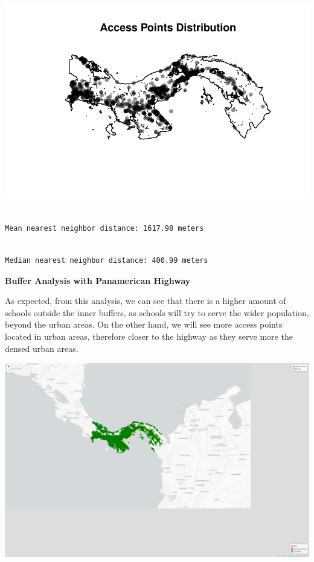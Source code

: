 \documentclass[
  letterpaper,
  DIV=11,
  numbers=noendperiod]{scrartcl}
\begin{document}
\includegraphics{index_files/figure-pdf/pairwise-intensity-2.pdf}

\begin{verbatim}

Mean nearest neighbor distance: 1617.98 meters
\end{verbatim}

\begin{verbatim}

Median nearest neighbor distance: 400.99 meters
\end{verbatim}

\textbf{Buffer Analysis with Panamerican Highway}

As expected, from this analysis, we can see that there is a higher
amount of schools outside the inner buffers, as schools will try to
serve the wider population, beyond the urban areas. On the other hand,
we will see more access points located in urban areas, therefore closer
to the highway as they serve more the densed urban areas.

\includegraphics{index_files/figure-pdf/buffer-analysis-1.pdf}
\end{document}
